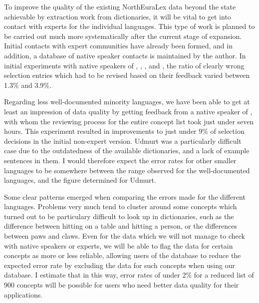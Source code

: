 To improve the quality of the existing NorthEuraLex data beyond the state achievable by extraction work from dictionaries, it will be vital to get into contact with experts for the individual languages. This type of work is planned to be carried out much more systematically after the current stage of expansion. Initial contacts with expert communities have already been formed, and in addition, a database of native speaker contacts is maintained by the author. In initial experiments with native speakers of , , , and , the ratio of clearly wrong selection entries which had to be revised based on their feedback varied between 1.3\% and 3.9\%.

Regarding less well-documented minority languages, we have been able to get at least an impression of data quality by getting feedback from a native speaker of , with whom the reviewing process for the entire concept list took just under seven hours. This experiment resulted in improvements to just under 9\% of selection decisions in the initial non-expert version. Udmurt was a particularly difficult case due to the outdatedness of the available dictionaries, and a lack of example sentences in them. I would therefore expect the error rates for other smaller languages to be somewhere between the range observed for the well-documented languages, and the figure determined for Udmurt.

Some clear patterns emerged when comparing the errors made for the different languages. Problems very much tend to cluster around some concepts which turned out to be particulary difficult to look up in dictionaries, such as the difference between hitting on a table and hitting a person, or the differences between paws and claws. Even for the data which we will not manage to check with native speakers or experts, we will be able to flag the data for certain concepts as more or less reliable, allowing users of the database to reduce the expected error rate by excluding the data for such concepts when using our database. I estimate that in this way, error rates of under 2\% for a reduced list of 900 concepts will be possible for users who need better data quality for their applications.

